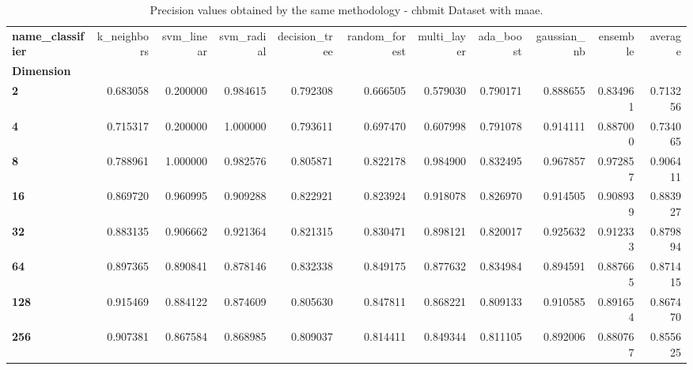 \begin{table}
\centering
\caption{Precision values obtained by the same methodology - chbmit Dataset with maae.}
\label{precision_chbmit_maae-reproduction}
\begin{tabular}{lrrrrrrrrrr}
\toprule
\textbf{name\_classifier} &  k\_neighbors &  svm\_linear &  svm\_radial &  decision\_tree &  random\_forest &  multi\_layer &  ada\_boost &  gaussian\_nb &  ensemble &   average \\
\textbf{Dimension} &              &             &             &                &                &              &            &              &           &           \\
\midrule
\textbf{2        } &     0.683058 &    0.200000 &    0.984615 &       0.792308 &       0.666505 &     0.579030 &   0.790171 &     0.888655 &  0.834961 &  0.713256 \\
\textbf{4        } &     0.715317 &    0.200000 &    1.000000 &       0.793611 &       0.697470 &     0.607998 &   0.791078 &     0.914111 &  0.887000 &  0.734065 \\
\textbf{8        } &     0.788961 &    1.000000 &    0.982576 &       0.805871 &       0.822178 &     0.984900 &   0.832495 &     0.967857 &  0.972857 &  0.906411 \\
\textbf{16       } &     0.869720 &    0.960995 &    0.909288 &       0.822921 &       0.823924 &     0.918078 &   0.826970 &     0.914505 &  0.908939 &  0.883927 \\
\textbf{32       } &     0.883135 &    0.906662 &    0.921364 &       0.821315 &       0.830471 &     0.898121 &   0.820017 &     0.925632 &  0.912333 &  0.879894 \\
\textbf{64       } &     0.897365 &    0.890841 &    0.878146 &       0.832338 &       0.849175 &     0.877632 &   0.834984 &     0.894591 &  0.887665 &  0.871415 \\
\textbf{128      } &     0.915469 &    0.884122 &    0.874609 &       0.805630 &       0.847811 &     0.868221 &   0.809133 &     0.910585 &  0.891654 &  0.867470 \\
\textbf{256      } &     0.907381 &    0.867584 &    0.868985 &       0.809037 &       0.814411 &     0.849344 &   0.811105 &     0.892006 &  0.880767 &  0.855625 \\
\bottomrule
\end{tabular}
\end{table}
